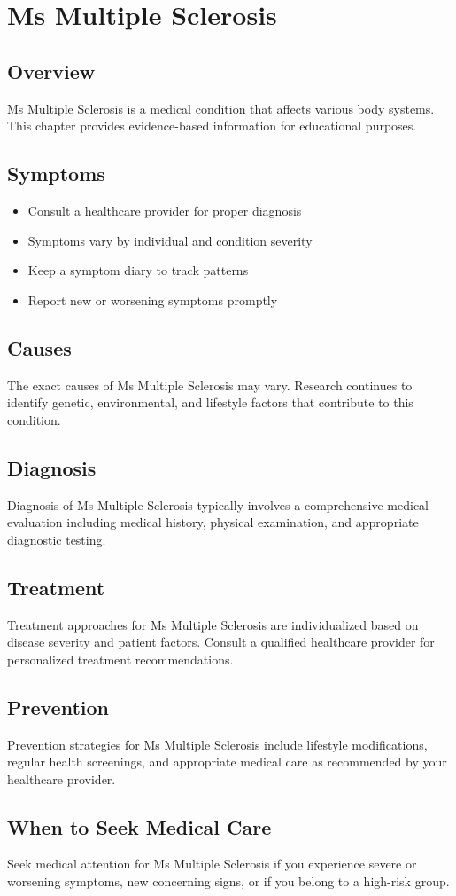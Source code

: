 \chapter{Ms Multiple Sclerosis}

\section*{Overview}
Ms Multiple Sclerosis is a medical condition that affects various body systems. This chapter provides evidence-based information for educational purposes.

\section*{Symptoms}
\begin{itemize}
  \item Consult a healthcare provider for proper diagnosis
  \item Symptoms vary by individual and condition severity
  \item Keep a symptom diary to track patterns
  \item Report new or worsening symptoms promptly
\end{itemize}

\section*{Causes}
The exact causes of Ms Multiple Sclerosis may vary. Research continues to identify genetic, environmental, and lifestyle factors that contribute to this condition.

\section*{Diagnosis}
Diagnosis of Ms Multiple Sclerosis typically involves a comprehensive medical evaluation including medical history, physical examination, and appropriate diagnostic testing.

\section*{Treatment}
Treatment approaches for Ms Multiple Sclerosis are individualized based on disease severity and patient factors. Consult a qualified healthcare provider for personalized treatment recommendations.

\section*{Prevention}
Prevention strategies for Ms Multiple Sclerosis include lifestyle modifications, regular health screenings, and appropriate medical care as recommended by your healthcare provider.

\section*{When to Seek Medical Care}
Seek medical attention for Ms Multiple Sclerosis if you experience severe or worsening symptoms, new concerning signs, or if you belong to a high-risk group.
\clearpage
